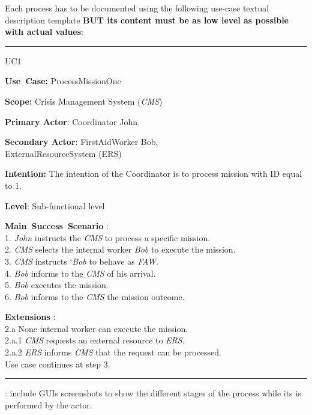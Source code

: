 Each process has to be documented using the following use-case textual description
template \cite{armour01usecase} \textbf{BUT its content must be as low level as possible with actual values}:
\vspace{0.5cm}
\hrule
\begin{lyxlist}{UC1}
\small{
\item [\textbf{Use~Case:}] ProcessMissionOne
\item [\textbf{Scope:}] Crisis Management System (\emph{CMS})
\item [\textbf{Primary Actor}:] Coordinator John
\item [\textbf{Secondary Actor}:] FirstAidWorker Bob,\\
                  ExternalResourceSystem (ERS)
\item [\textbf{Intention:}]The intention of the Coordinator is to process mission with ID equal to 1.
\item [\textbf{Level}:]Sub-functional level
\item [\textbf{Main~Success~Scenario}]:\\
1. \emph{John} instructs the \emph{CMS} to process a specific mission.\\
2. \emph{CMS} selects the internal worker \emph{Bob} to execute the mission.\\
3. \emph{CMS} instructs `\emph{Bob} to behave as \emph{FAW}.\\
4. \emph{Bob} informs to the \emph{CMS} of his arrival.\\
5. \emph{Bob} executes the mission.\\
6. \emph{Bob} informs to the \emph{CMS} the mission outcome.
\item [\textbf{Extensions}]:\\
2.a None internal worker can execute the mission.\\
\hspace*{0.5cm} 2.a.1 \emph{CMS} requests an external resource to \emph{ERS}.\\
\hspace*{0.5cm} 2.a.2 \emph{ERS} informs \emph{CMS} that the request can be processed.\\
\hspace*{1.4cm} Use case continues at step 3.

}

\end{lyxlist}
\hrule
\vspace{0.5cm}

: include GUIs screenshots to show the
different stages of the process while its is performed by the actor.



